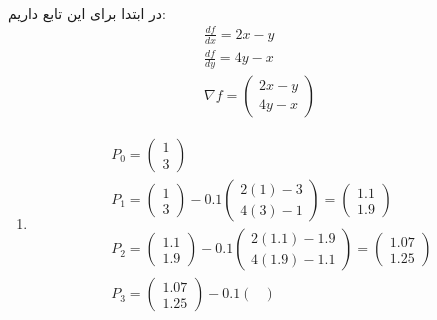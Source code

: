 \\\noindent
در ابتدا برای این تابع داریم:
\begin{gather*}
    \frac{df}{dx} = 2x - y\\
    \frac{df}{dy} = 4y - x\\
    \nabla f = \begin{pmatrix}
        2x - y\\
        4y - x
    \end{pmatrix} 
\end{gather*}
\begin{enumerate}
    \item \begin{gather*}
        P_0 = \begin{pmatrix}
            1\\
            3
        \end{pmatrix}\\
        P_1 = \begin{pmatrix}
            1\\
            3
        \end{pmatrix} - 0.1 \begin{pmatrix}
            2(1) - 3\\
            4(3) - 1
        \end{pmatrix}
        = \begin{pmatrix}
            1.1\\
            1.9
        \end{pmatrix}\\
        P_2 = \begin{pmatrix}
            1.1\\
            1.9
        \end{pmatrix} - 0.1 \begin{pmatrix}
            2(1.1) - 1.9\\
            4(1.9) - 1.1
        \end{pmatrix}
        = \begin{pmatrix}
            1.07\\
            1.25
        \end{pmatrix}\\
        P_3 = \begin{pmatrix}
            1.07\\
            1.25
        \end{pmatrix} - 0.1 \begin{pmatrix}

\end{pmatrix}
\end{gather*}
\end{enumerate}
